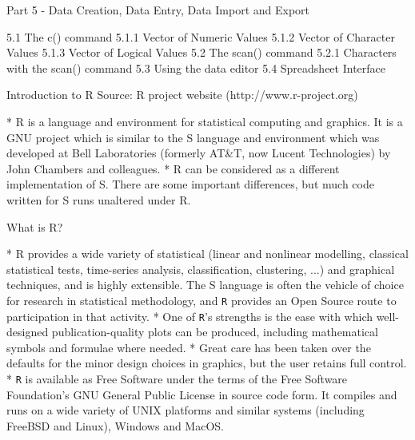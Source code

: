 \documentclass{beamer}
\begin{document}
 
 
 
{Part 5 - Data Creation, Data Entry, Data Import and Export}
 \begin{framed}
 \begin{semiverbatim}
 5.1 The c() command 
 5.1.1 Vector of Numeric Values
 5.1.2 Vector of Character Values
 5.1.3 Vector of Logical Values 
 5.2 The scan() command 
 5.2.1 Characters with the scan() command
 5.3 Using the data editor
 5.4 Spreadsheet Interface 
 \end{semiverbatim}
 \end{framed}
 
 
 
 
 
{Introduction to R}
 Source: R project website (http://www.r-project.org)
 
 *  R is a language and environment for statistical computing and graphics. It is a GNU project
 which is similar to the S language and environment which was developed at Bell Laboratories
 (formerly AT\&T, now Lucent Technologies) by John Chambers and colleagues. 
 *  R can be considered
 as a different implementation of S. There are some important differences, but much
 code written for S runs unaltered under R.

 
 
 
 
{What is R?}
 
 *  R provides a wide variety of statistical (linear and nonlinear modelling, classical statistical tests,
 time-series analysis, classification, clustering, ...) and graphical techniques, and is highly extensible.
 The S language is often the vehicle of choice for research in statistical methodology,
 and \texttt{R} provides an Open Source route to participation in that activity.
 *  One of \texttt{R}’s strengths is the ease with which well-designed publication-quality plots can be
 produced, including mathematical symbols and formulae where needed. 
 *  Great care has been
 taken over the defaults for the minor design choices in graphics, but the user retains full control.
 *  \texttt{R} is available as Free Software under the terms of the Free Software Foundation’s GNU General
 Public License in source code form. It compiles and runs on a wide variety of UNIX platforms
 and similar systems (including FreeBSD and Linux), Windows and MacOS.
\end{document}
